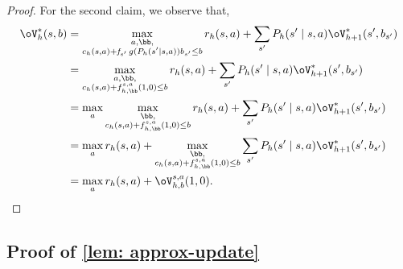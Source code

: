 \documentclass[pdftex, a4paper, 12pt]{article}
\DeclareMathOperator*{\f}{\mathit{f}}
\begin{document}
\begin{proof}
    For the second claim, we observe that,
    \begin{align*}
        \oV^*_h(s,b) &= \max_{\substack{a, \bb, \\ c_h(s,a) + \f_{s'}g(P_h(s' \mid s,a))b_{s'} \leq b}} r_h(s,a) + \sum_{s'} P_h(s' \mid s,a)\oV^*_{h+1}(s', b_{s'}) \\
        &= \max_{\substack{a, \bb, \\ c_h(s,a) + f_{h,\bb}^{s,a}(1,0) \leq b}} r_h(s,a) + \sum_{s'} P_h(s' \mid s,a)\oV^*_{h+1}(s', b_{s'}) \\
        &= \max_{a}\max_{\substack{\bb, \\ c_h(s,a) + f_{h,\bb}^{s,a}(1,0) \leq b}} r_h(s,a) + \sum_{s'} P_h(s' \mid s,a)\oV^*_{h+1}(s', b_{s'}) \\ 
        &= \max_{a} r_h(s,a) + \max_{\substack{\bb, \\ c_h(s,a) + f_{h,\bb}^{s,a}(1,0) \leq b}} \sum_{s'} P_h(s' \mid s,a)\oV^*_{h+1}(s', b_{s'}) \\
        &= \max_{a} r_h(s,a) + \oV^{s,a}_{h,b}(1,0).
    \end{align*}
\end{proof}


\subsection{Proof of \texorpdfstring{\cref{lem: approx-update}}{lem: approx-update}}
\end{document}
